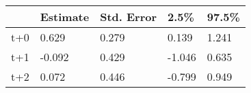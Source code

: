 \begin{tabular}{lllll}
  \toprule
  & Estimate & Std. Error & 2.5\% & 97.5\% \\ 
  \midrule
t+0 & 0.629 & 0.279 & 0.139 & 1.241 \\ 
  t+1 & -0.092 & 0.429 & -1.046 & 0.635 \\ 
  t+2 & 0.072 & 0.446 & -0.799 & 0.949 \\ 
   \bottomrule
\end{tabular}
